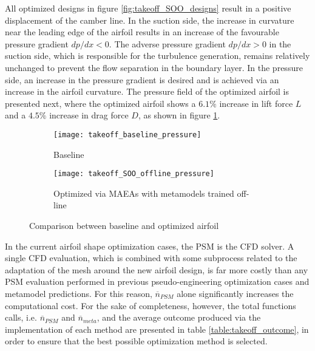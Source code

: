 All optimized designs in figure \ref{fig:takeoff_SOO_designs} 
result in a positive displacement of the camber line. In the 
suction side, the increase in curvature near the leading edge of 
the airfoil results in an increase of the favourable pressure 
gradient $dp/dx < 0$. The adverse pressure gradient $dp/dx > 0$ in 
the suction side, which is responsible for the turbulence 
generation, remains relatively unchanged to prevent the flow 
separation in the boundary layer. In the pressure side, an increase 
in the pressure gradient is desired and is achieved via an increase 
in the airfoil curvature. The pressure field of the optimized 
airfoil is presented next, where the optimized airfoil shows a 
$6.1 \%$ increase in lift force $L$ and a $4.5 \%$ increase in 
drag force $D$, as shown in figure 
\ref{fig:takeoff_SOO_before_after}.

\begin{figure}[h!]
\centering
	\begin{subfigure}[b]{0.49\textwidth}
	\centering
	\caption{Baseline}
	\texttt{[image: takeoff\_baseline\_pressure]} 
	\end{subfigure}
	\hfill
	\begin{subfigure}[b]{0.49\textwidth}
	\centering
	\caption{Optimized via MAEAs with metamodels trained off-line}
	\texttt{[image: takeoff\_SOO\_offline\_pressure]}   
	\end{subfigure}
\caption{Comparison between baseline and optimized airfoil} 
\label{fig:takeoff_SOO_before_after}
\end{figure}

\newpage


In the current airfoil shape optimization cases, the PSM is the CFD 
solver. A single CFD evaluation, which is combined with some 
subprocess related to the adaptation of the mesh around the new 
airfoil design, is far more costly than any PSM evaluation 
performed in previous pseudo-engineering optimization cases and  
metamodel predictions. For this reason, $\overline{n}_{PSM}$ alone 
significantly increases the computational cost. For the sake of 
completeness, however, the total functions calls, i.e. 
$\overline{n}_{PSM}$ and $\overline{n}_{meta}$, and the average 
outcome produced via the implementation of each method are 
presented in table \ref{table:takeoff_outcome}, in order to ensure 
that the best possible optimization method is selected.

